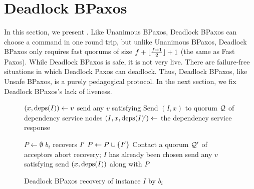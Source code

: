 \section{Deadlock BPaxos}
In this section, we present . Like Unanimous BPaxos,
Deadlock BPaxos can choose a command in one round trip, but unlike Unanimous
BPaxos, Deadlock BPaxos only requires fast quorums of size $f + \lfloor\frac{f + 1}{2}\rfloor + 1$
(the same as Fast Paxos).
%
While Deadlock BPaxos is safe, it is not very live. There are failure-free
situations in which Deadlock Paxos can deadlock. Thus, Deadlock BPaxos, like
Unsafe BPaxos, is a purely pedagogical protocol. In the next section, we fix
Deadlock BPaxos's lack of liveness.


\begin{wrapfigure}{r}{3.6in}
  \begin{minipage}{3.6in}
    \begin{algorithm}[H]
      \caption{Deadlock BPaxos recovery of instance $I$ by $b_i$}%
      \begin{algorithmic}[1]
          \State $(x, \text{deps}(I)) \gets v$
        \Else{}
          \State send any $v$ satisfying 
        \EndIf{}
        \State Send $(I, x)$ to quorum $\mathcal{Q}$ of dependency service nodes
        \State $(I, x, \text{deps}(I)') \gets$ the dependency service response

        \State
        \State $P \gets \emptyset$
            \State $b_i$ recovers $I'$
          \EndIf
            \State $P \gets P \cup \{I'\}$
          \Else{}
            \State Contact a quorum $\mathcal{Q}'$ of acceptors
              \State abort recovery; $I$ has already been chosen
            \Else{}
              \State send any $v$ satisfying 
            \EndIf{}
          \EndIf{}
        \EndFor{}
        \State send $(x, \text{deps}(I))$ along with $P$
      \end{algorithmic}
    \end{algorithm}
  \end{minipage}
\end{wrapfigure}

\lipsum[1-5]


